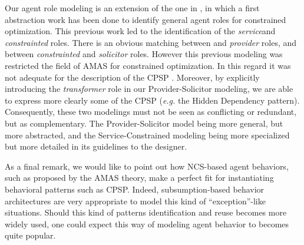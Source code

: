 Our agent role modeling is an extension of the one in \cite{Ka2011.6}, in which a first abstraction work has been done to identify general agent roles for constrained optimization. This previous work led to the identification of the \emph{service}and  \emph{constrainted} roles. There is an obvious matching between  and \emph{provider} roles, and between \emph{constrainted} and \emph{solicitor} roles. However this previous modeling was restricted the field of AMAS for constrained optimization. In this regard it was not adequate for the description of the CPSP . Moreover, by explicitly introducing the \emph{transformer} role in our Provider-Solicitor modeling, we are able to express more clearly some of the CPSP (\emph{e.g.} the Hidden Dependency pattern).\\
Consequently, these two modelings must not be seen as conflicting or redundant, but as complementary. The Provider-Solicitor model being more general, but more abstracted, and the Service-Constrained modeling being more specialized but more detailed in its guidelines to the designer.

As a final remark, we would like to point out how NCS-based agent behaviors, such as proposed by the AMAS theory, make a perfect fit for instantiating behavioral patterns such as CPSP. Indeed, subsumption-based behavior architectures are very appropriate to model this kind of \enquote{exception}-like situations. Should this kind of patterns identification and reuse becomes more widely used, one could expect this way of modeling agent behavior to becomes quite popular.